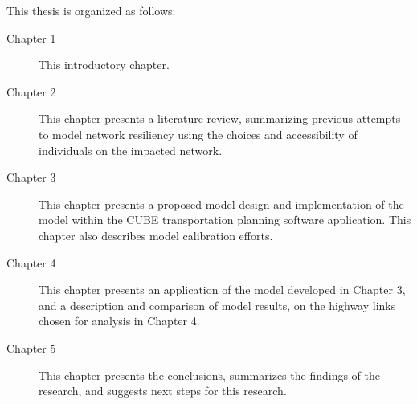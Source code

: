 \noindent This thesis is organized as follows:

\begin{description}
	\item [Chapter 1]	{This introductory chapter.}
	\item [Chapter 2]	{This chapter presents a literature review, summarizing previous attempts to model network resiliency using the choices and accessibility of individuals on the impacted network.}
	\item [Chapter 3]	{This chapter presents a proposed model design and implementation of the model within the CUBE transportation planning software application. This chapter also describes model calibration efforts.}
  \item [Chapter 4]	{This chapter presents an application of the model developed in Chapter 3, and a description and comparison of model results, on the highway links chosen for analysis in Chapter 4.}
	\item [Chapter 5]	{This chapter presents the conclusions, summarizes the findings of the research, and suggests next steps for this research.}
\end{description}
